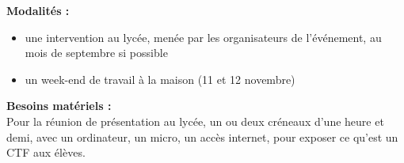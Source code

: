 \documentclass[11pt,a4paper,article]{nsi}
\begin{document}
\textbf{Modalités : }
\begin{itemize}
    \item une intervention au lycée, menée par les organisateurs de l'événement, au mois de septembre si possible 
    \item un week-end de travail à la maison (11 et 12 novembre)\\
\end{itemize} 

\textbf{Besoins matériels : }\\
Pour la réunion de présentation au lycée, un ou deux créneaux d'une heure et demi, avec un ordinateur, un micro, un accès internet, pour exposer ce qu'est un CTF aux élèves.
\end{document}
